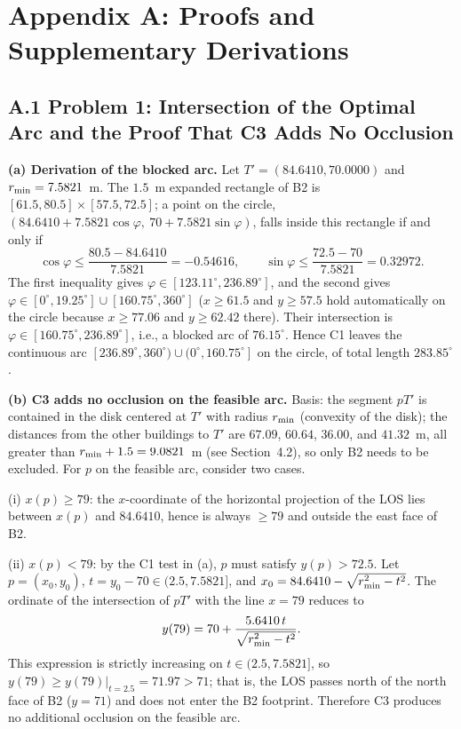 \section*{Appendix A: Proofs and Supplementary Derivations}

\subsection*{A.1 Problem 1: Intersection of the Optimal Arc and the Proof That C3 Adds No Occlusion}

\noindent\textbf{(a) Derivation of the blocked arc.} Let $T'=(84.6410,70.0000)$ and $r_{\min}=7.5821$~m. The $1.5$~m expanded rectangle of B2 is $[61.5,80.5]\times[57.5,72.5]$; a point on the circle, $(84.6410+7.5821\cos\varphi,\ 70+7.5821\sin\varphi)$, falls inside this rectangle if and only if
\begin{equation}
  \cos\varphi\le\frac{80.5-84.6410}{7.5821}=-0.54616,
  \qquad
  \sin\varphi\le\frac{72.5-70}{7.5821}=0.32972.
\end{equation}
The first inequality gives $\varphi\in[123.11^\circ,236.89^\circ]$, and the second gives $\varphi\in[0^\circ,19.25^\circ]\cup[160.75^\circ,360^\circ]$ ($x\ge61.5$ and $y\ge57.5$ hold automatically on the circle because $x\ge77.06$ and $y\ge62.42$ there). Their intersection is $\varphi\in[160.75^\circ,236.89^\circ]$, i.e., a blocked arc of $76.15^\circ$. Hence C1 leaves the continuous arc $[236.89^\circ,360^\circ)\cup(0^\circ,160.75^\circ]$ on the circle, of total length $283.85^\circ$.

\noindent\textbf{(b) C3 adds no occlusion on the feasible arc.} Basis: the segment $pT'$ is contained in the disk centered at $T'$ with radius $r_{\min}$ (convexity of the disk); the distances from the other buildings to $T'$ are $67.09$, $60.64$, $36.00$, and $41.32$~m, all greater than $r_{\min}+1.5=9.0821$~m (see Section~4.2), so only B2 needs to be excluded. For $p$ on the feasible arc, consider two cases.

\noindent (i) $x(p)\ge79$: the $x$-coordinate of the horizontal projection of the LOS lies between $x(p)$ and $84.6410$, hence is always $\ge79$ and outside the east face of B2.

\noindent (ii) $x(p)<79$: by the C1 test in (a), $p$ must satisfy $y(p)>72.5$. Let $p=(x_0,y_0)$, $t=y_0-70\in(2.5,7.5821]$, and $x_0=84.6410-\sqrt{r_{\min}^2-t^2}$. The ordinate of the intersection of $pT'$ with the line $x=79$ reduces to
\begin{equation}
  y(79)=70+\frac{5.6410\,t}{\sqrt{r_{\min}^2-t^2}}.
\end{equation}
This expression is strictly increasing on $t\in(2.5,7.5821]$, so $y(79)\ge y(79)|_{t=2.5}=71.97>71$; that is, the LOS passes north of the north face of B2 ($y=71$) and does not enter the B2 footprint. Therefore C3 produces no additional occlusion on the feasible arc.

